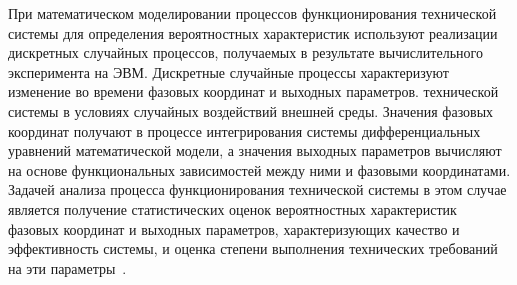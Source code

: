 При математическом моделировании процессов функционирования
технической системы для определения вероятностных характеристик
используют реализации дискретных случайных процессов, получаемых в
результате вычислительного эксперимента на ЭВМ. Дискретные случайные
процессы характеризуют изменение во времени фазовых координат и выходных
параметров. технической системы в условиях случайных воздействий внешней
среды. Значения фазовых координат получают в процессе интегрирования
системы дифференциальных уравнений математической модели, а значения
выходных параметров вычисляют на основе функциональных зависимостей
между ними и фазовыми координатами. Задачей анализа процесса
функционирования технической системы в этом случае является получение
статистических оценок вероятностных характеристик фазовых координат и
выходных параметров, характеризующих качество и эффективность системы, и
оценка степени выполнения технических требований на эти параметры~\cite{modeling:2004}.
